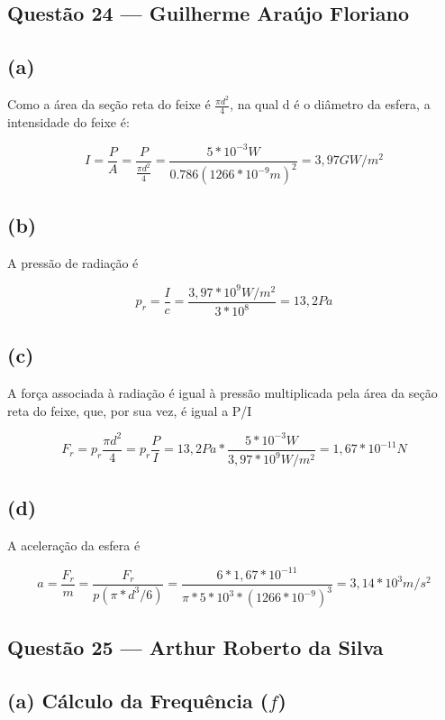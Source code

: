 \documentclass[12pt,a4paper]{article}
\begin{document}
\subsection{Questão 24 — Guilherme Araújo Floriano}

\subsection*{(a)}

Como a área da seção reta do feixe é $\frac{\pi d^2}{4}$, na qual d é o diâmetro da esfera, a intensidade
do feixe é:

\[
I = \frac{P}{A} = \frac{P}{\frac{\pi d^2}{4}} = \frac{5 * 10^{-3} W}{0.786 (1266*10^{-9}m)^2} = 3,97 GW/m^2
\]

\subsection*{(b)}

A pressão de radiação é

\[
p_r = \frac{I}{c} = \frac{3,97 * 10^9 W/m^2}{3 * 10^8} = 13,2 Pa    
\]

\subsection*{(c)}

A força associada à radiação é igual à pressão multiplicada pela área da seção reta do feixe, que, por sua vez, é igual a P/I

\[
F_r = p_r\frac{\pi d^2}{4} = p_r\frac{P}{I} = 13,2 Pa * \frac{5*10^{-3}W}{3,97*10^9 W/m^2} = 1,67 * 10^{-11} N
\]

\subsection*{(d)}

A aceleração da esfera é

\[
a = \frac{F_r}{m} = \frac{F_r}{p(\pi*d^3/6)} = \frac{6*1,67*10^{-11}}{\pi * 5*10^3 * (1266*10^{-9})^3} = 3,14 * 10^3 m/s^2
\]

\subsection{Questão 25 — Arthur Roberto da Silva}
\subsection*{(a) Cálculo da Frequência ($f$)}
\end{document}
